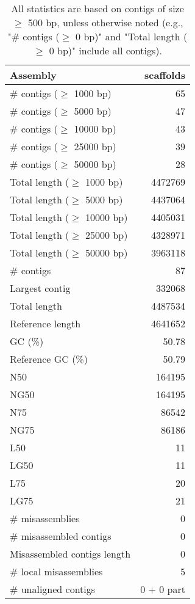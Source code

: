 \documentclass[12pt,a4paper]{article}
\begin{document}
\begin{table}[ht]
\begin{center}
\caption{All statistics are based on contigs of size $\geq$ 500 bp, unless otherwise noted (e.g., "\# contigs ($\geq$ 0 bp)" and "Total length ($\geq$ 0 bp)" include all contigs).}
\begin{tabular}{|l*{1}{|r}|}
\hline
Assembly & scaffolds \\ \hline
\# contigs ($\geq$ 1000 bp) & 65 \\ \hline
\# contigs ($\geq$ 5000 bp) & 47 \\ \hline
\# contigs ($\geq$ 10000 bp) & 43 \\ \hline
\# contigs ($\geq$ 25000 bp) & 39 \\ \hline
\# contigs ($\geq$ 50000 bp) & 28 \\ \hline
Total length ($\geq$ 1000 bp) & 4472769 \\ \hline
Total length ($\geq$ 5000 bp) & 4437064 \\ \hline
Total length ($\geq$ 10000 bp) & 4405031 \\ \hline
Total length ($\geq$ 25000 bp) & 4328971 \\ \hline
Total length ($\geq$ 50000 bp) & 3963118 \\ \hline
\# contigs & 87 \\ \hline
Largest contig & 332068 \\ \hline
Total length & 4487534 \\ \hline
Reference length & 4641652 \\ \hline
GC (\%) & 50.78 \\ \hline
Reference GC (\%) & 50.79 \\ \hline
N50 & 164195 \\ \hline
NG50 & 164195 \\ \hline
N75 & 86542 \\ \hline
NG75 & 86186 \\ \hline
L50 & 11 \\ \hline
LG50 & 11 \\ \hline
L75 & 20 \\ \hline
LG75 & 21 \\ \hline
\# misassemblies & 0 \\ \hline
\# misassembled contigs & 0 \\ \hline
Misassembled contigs length & 0 \\ \hline
\# local misassemblies & 5 \\ \hline
\# unaligned contigs & 0 + 0 part \\ \hline

\end{tabular}
\end{center}
\end{table}
\end{document}
